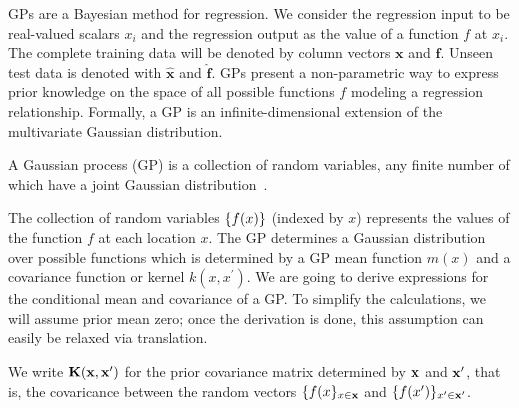 \ac{GP}s are a Bayesian method for regression. We consider the regression input to be real-valued scalars $x_i$ and the regression output as the value of a function $f$ at $x_i$. The complete training data will be denoted by column vectors $\mathbf{x}$ and $\mathbf{f}$. Unseen test data is denoted with $\mathbf{\hat{x}}$ and $\mathbf{\hat{f}}$.
\ac{GP}s present a non-parametric way to express prior knowledge on the space of all possible functions $f$ modeling
a regression relationship.
Formally, a GP is an infinite-dimensional extension of the multivariate Gaussian distribution.
\begin{definition}
A Gaussian process (GP) is a collection of random variables, any
finite number of which have a joint Gaussian distribution~\citep[][chapter 2]{rasmussen2006gaussian}.
\end{definition}
The collection of random variables $\left\{ f(x) \right\}$ (indexed by $x$) represents the
values of the function $f$ at each location $x$.
The \ac{GP} determines a Gaussian distribution over possible functions 
which is determined by a \ac{GP} mean function $m(x)$ and a covariance function or kernel $k(x,x^\prime)$.
We are going to derive expressions for the conditional mean and covariance of a
GP.  To simplify the calculations, we will assume prior mean zero; once the
derivation is done, this assumption can easily be relaxed via translation.

We write $\mathbf{K}(\mathbf{x},\mathbf{x}^\prime)$ for the prior covariance matrix determined by $\mathbf{x}$ and $\mathbf{x}^\prime$, that
is, the covaricance between the random vectors $\{f(x\}_{x \in \mathbf{x}}$ and $\{f(x')\}_{x' \in
\mathbf{x}'}$.
 

